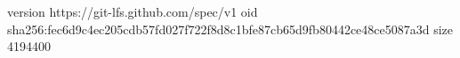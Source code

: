 version https://git-lfs.github.com/spec/v1
oid sha256:fec6d9c4ec205cdb57fd027f722f8d8c1bfe87cb65d9fb80442ce48ce5087a3d
size 4194400
